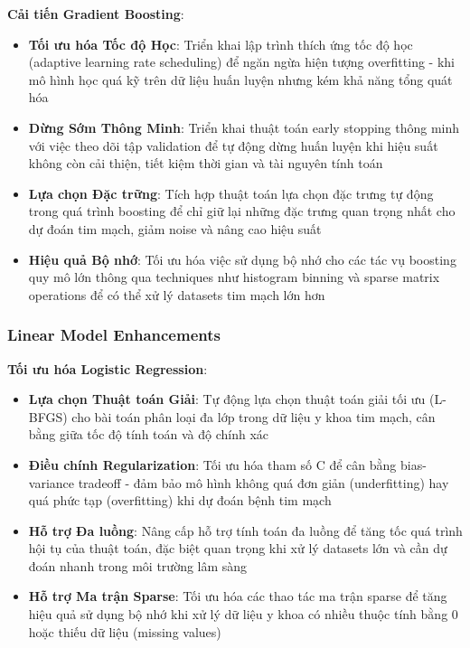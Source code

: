 \textbf{Cải tiến Gradient Boosting}:
\begin{itemize}
    \item \textbf{Tối ưu hóa Tốc độ Học}: Triển khai lập trình thích ứng tốc độ học (adaptive learning rate scheduling) để ngăn ngừa hiện tượng overfitting - khi mô hình học quá kỹ trên dữ liệu huấn luyện nhưng kém khả năng tổng quát hóa
    \item \textbf{Dừng Sớm Thông Minh}: Triển khai thuật toán early stopping thông minh với việc theo dõi tập validation để tự động dừng huấn luyện khi hiệu suất không còn cải thiện, tiết kiệm thời gian và tài nguyên tính toán
    \item \textbf{Lựa chọn Đặc trững}: Tích hợp thuật toán lựa chọn đặc trưng tự động trong quá trình boosting để chỉ giữ lại những đặc trưng quan trọng nhất cho dự đoán tim mạch, giảm noise và nâng cao hiệu suất
    \item \textbf{Hiệu quả Bộ nhớ}: Tối ưu hóa việc sử dụng bộ nhớ cho các tác vụ boosting quy mô lớn thông qua techniques như histogram binning và sparse matrix operations để có thể xử lý datasets tim mạch lớn hơn
\end{itemize}

\subsubsection{Linear Model Enhancements}

\textbf{Tối ưu hóa Logistic Regression}:
\begin{itemize}
    \item \textbf{Lựa chọn Thuật toán Giải}: Tự động lựa chọn thuật toán giải tối ưu (L-BFGS) cho bài toán phân loại đa lớp trong dữ liệu y khoa tim mạch, cân bằng giữa tốc độ tính toán và độ chính xác
    \item \textbf{Điều chính Regularization}: Tối ưu hóa tham số C để cân bằng bias-variance tradeoff - đảm bảo mô hình không quá đơn giản (underfitting) hay quá phức tạp (overfitting) khi dự đoán bệnh tim mạch
    \item \textbf{Hỗ trợ Đa luồng}: Nâng cấp hỗ trợ tính toán đa luồng để tăng tốc quá trình hội tụ của thuật toán, đặc biệt quan trọng khi xử lý datasets lớn và cần dự đoán nhanh trong môi trường lâm sàng
    \item \textbf{Hỗ trợ Ma trận Sparse}: Tối ưu hóa các thao tác ma trận sparse để tăng hiệu quả sử dụng bộ nhớ khi xử lý dữ liệu y khoa có nhiều thuộc tính bằng 0 hoặc thiếu dữ liệu (missing values)
\end{itemize}

